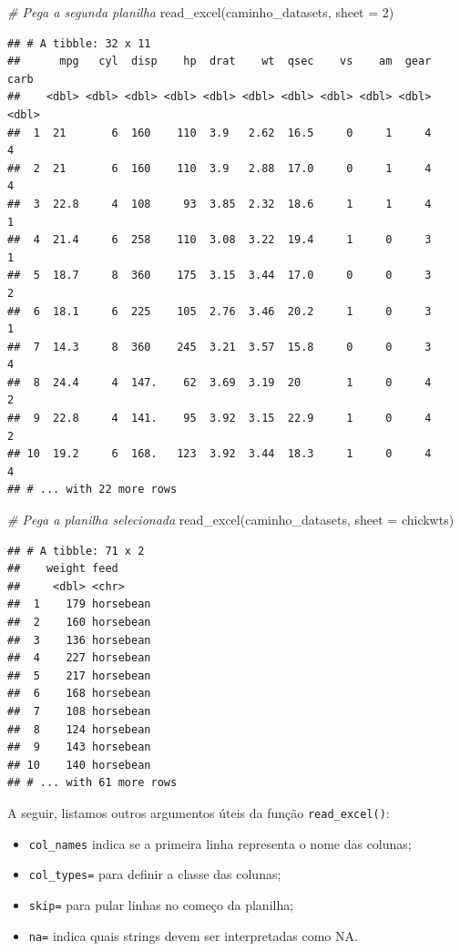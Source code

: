 \documentclass[
]{book}
\newenvironment{Shaded}{\begin{snugshade}}{\end{snugshade}}
\newcommand{\AttributeTok}[1]{\textcolor[rgb]{0.77,0.63,0.00}{#1}}
\newcommand{\CommentTok}[1]{\textcolor[rgb]{0.56,0.35,0.01}{\textit{#1}}}
\newcommand{\DecValTok}[1]{\textcolor[rgb]{0.00,0.00,0.81}{#1}}
\newcommand{\FunctionTok}[1]{\textcolor[rgb]{0.00,0.00,0.00}{#1}}
\newcommand{\NormalTok}[1]{#1}
\newcommand{\StringTok}[1]{\textcolor[rgb]{0.31,0.60,0.02}{#1}}
\begin{document}
\begin{Shaded}
\begin{Highlighting}[]
\CommentTok{\# Pega a segunda planilha}
\FunctionTok{read\_excel}\NormalTok{(caminho\_datasets, }\AttributeTok{sheet =} \DecValTok{2}\NormalTok{)}
\end{Highlighting}
\end{Shaded}

\begin{verbatim}
## # A tibble: 32 x 11
##      mpg   cyl  disp    hp  drat    wt  qsec    vs    am  gear  carb
##    <dbl> <dbl> <dbl> <dbl> <dbl> <dbl> <dbl> <dbl> <dbl> <dbl> <dbl>
##  1  21       6  160    110  3.9   2.62  16.5     0     1     4     4
##  2  21       6  160    110  3.9   2.88  17.0     0     1     4     4
##  3  22.8     4  108     93  3.85  2.32  18.6     1     1     4     1
##  4  21.4     6  258    110  3.08  3.22  19.4     1     0     3     1
##  5  18.7     8  360    175  3.15  3.44  17.0     0     0     3     2
##  6  18.1     6  225    105  2.76  3.46  20.2     1     0     3     1
##  7  14.3     8  360    245  3.21  3.57  15.8     0     0     3     4
##  8  24.4     4  147.    62  3.69  3.19  20       1     0     4     2
##  9  22.8     4  141.    95  3.92  3.15  22.9     1     0     4     2
## 10  19.2     6  168.   123  3.92  3.44  18.3     1     0     4     4
## # ... with 22 more rows
\end{verbatim}

\begin{Shaded}
\begin{Highlighting}[]
\CommentTok{\# Pega a planilha selecionada}
\FunctionTok{read\_excel}\NormalTok{(caminho\_datasets, }\AttributeTok{sheet =} \StringTok{\textquotesingle{}chickwts\textquotesingle{}}\NormalTok{)}
\end{Highlighting}
\end{Shaded}

\begin{verbatim}
## # A tibble: 71 x 2
##    weight feed     
##     <dbl> <chr>    
##  1    179 horsebean
##  2    160 horsebean
##  3    136 horsebean
##  4    227 horsebean
##  5    217 horsebean
##  6    168 horsebean
##  7    108 horsebean
##  8    124 horsebean
##  9    143 horsebean
## 10    140 horsebean
## # ... with 61 more rows
\end{verbatim}

A seguir, listamos outros argumentos úteis da função \texttt{read\_excel()}:

\begin{itemize}
\item
  \texttt{col\_names} indica se a primeira linha representa o nome das colunas;
\item
  \texttt{col\_types=} para definir a classe das colunas;
\item
  \texttt{skip=} para pular linhas no começo da planilha;
\item
  \texttt{na=} indica quais strings devem ser interpretadas como NA.
\end{itemize}
\end{document}
